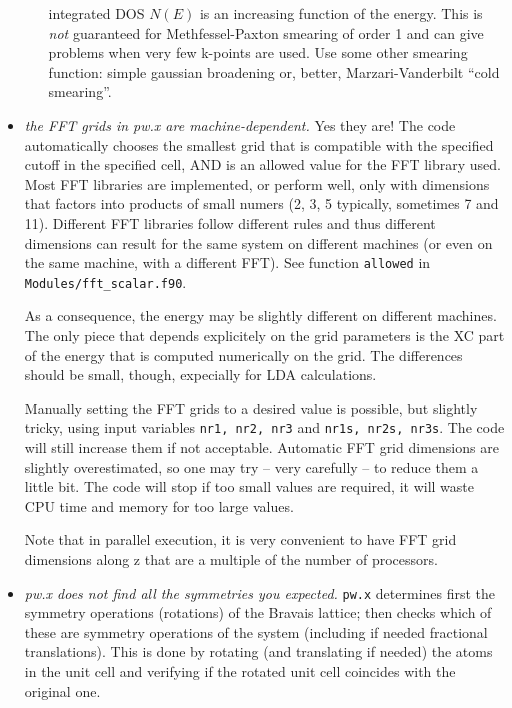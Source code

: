 \documentclass[12pt]{article}
\begin{document}
\begin{itemize}
\begin{enumerate}
      integrated DOS $N(E)$ is an increasing function of the energy. 
      This is {\em not} guaranteed for Methfessel-Paxton smearing of
      order 1 and can give problems when very few k-points are used.
      Use some other smearing function: simple gaussian broadening
      or, better, Marzari-Vanderbilt ``cold smearing''.
      \end{enumerate}
\item {\em the FFT grids in pw.x are machine-dependent.}
      Yes they are! The code  automatically chooses the smallest 
      grid that is compatible with the specified cutoff in the
      specified cell, AND is an allowed value for the FFT library 
      used. Most FFT libraries are implemented, or perform well,
      only with dimensions that factors into products of small
      numers (2, 3, 5 typically, sometimes 7 and 11). Different
      FFT libraries follow different rules and thus different
      dimensions can result for the same system on different 
      machines (or even on the same machine, with a different FFT).
      See function {\tt allowed} in {\tt Modules/fft\_scalar.f90}.

      As a consequence, the energy may be slightly different on
      different machines. The only piece that depends explicitely
      on the grid parameters is the XC part of the energy that is 
      computed numerically on the grid. The differences should be
      small, though, expecially for LDA calculations.

      Manually setting the FFT grids to a desired value is
      possible, but slightly tricky, using input variables
      {\tt nr1, nr2, nr3} and {\tt nr1s, nr2s, nr3s}. The code
      will still increase them if not acceptable. Automatic FFT 
      grid dimensions are slightly overestimated, so one may try 
      -- very carefully -- to reduce them a little bit. The code
      will stop if too small values are required, it will waste CPU
      time and memory for too large values.
 
      Note that in parallel execution, it is very convenient
      to have FFT grid dimensions along z that are a multiple
      of the number of processors.

\item {\em pw.x does not find all the symmetries you expected.}
      {\tt pw.x} determines first the symmetry operations (rotations)
      of the Bravais lattice; then checks which of these are
      symmetry operations of the system (including if needed
      fractional translations). This is done by rotating
      (and translating if needed) the atoms in the unit cell
      and verifying if the rotated unit cell coincides with
      the original one.


\end{itemize}
\end{document}
